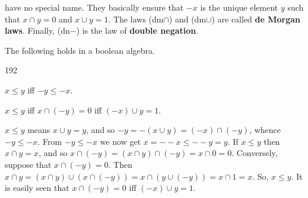 have no special name. They basically ensure that $-x$ is the
unique element $y$ such that $x \cap y = 0$ and $x \cup y = 1$.
The laws (dm$\cap$) and (dm$\cup$) are called \textbf{de Morgan
laws}. Finally, (dn$-$) is the law of \textbf{double negation}.
\begin{lem}
\label{lem:complement}
The following holds in a boolean algebra.
\begin{dingautolist}{192}
\item
$x \leq y$ iff $-y \leq -x$.
\item
$x \leq y$ iff $x \cap (-y) = 0$ iff $(-x) \cup y = 1$.
\end{dingautolist}
\end{lem}
\proofbeg
{} $x \leq y$ means $x \cup y = y$, and so
$- y = -(x \cup y) = (-x) \cap (-y)$, whence $-y \leq -x$.
From $-y \leq -x$ we now get $x = --x \leq --y = y$.
 If $x \leq y$ then $x \cap y = x$, and so
$x \cap (-y) = (x \cap y) \cap (-y) = x \cap 0 = 0$.
Conversely, suppose that $x \cap (-y) = 0$. Then
$x \cap y = (x \cap y) \cup (x \cap (-y)) =
x \cap (y \cup (-y)) = x \cap 1 = x$. So, $x \leq y$.
It is easily seen that $x \cap (-y) = 0$ iff
$(-x) \cup y = 1$.
\proofend

